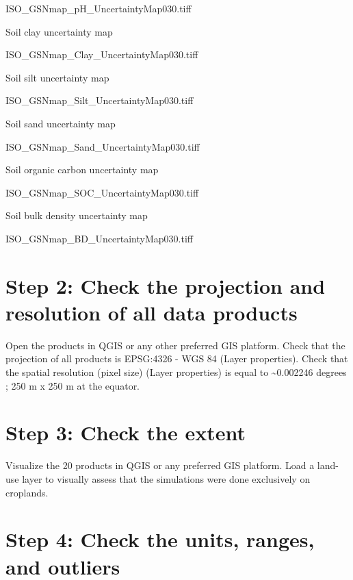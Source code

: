 \documentclass[
  10pt,
  b5paper,
  oneside]{book}
\begin{document}
ISO\_GSNmap\_pH\_UncertaintyMap030.tiff

Soil clay uncertainty map

ISO\_GSNmap\_Clay\_UncertaintyMap030.tiff

Soil silt uncertainty map

ISO\_GSNmap\_Silt\_UncertaintyMap030.tiff

Soil sand uncertainty map

ISO\_GSNmap\_Sand\_UncertaintyMap030.tiff

Soil organic carbon uncertainty map

ISO\_GSNmap\_SOC\_UncertaintyMap030.tiff

Soil bulk density uncertainty map

ISO\_GSNmap\_BD\_UncertaintyMap030.tiff

\hypertarget{step-2-check-the-projection-and-resolution-of-all-data-products}{%
\section*{Step 2: Check the projection and resolution of all data products}\label{step-2-check-the-projection-and-resolution-of-all-data-products}}

Open the products in QGIS or any other preferred GIS platform. Check that the projection of all products is EPSG:4326 - WGS 84 (Layer properties). Check that the spatial resolution (pixel size) (Layer properties) is equal to \textasciitilde0.002246 degrees ; 250 m x 250 m at the equator.

\hypertarget{step-3-check-the-extent}{%
\section*{Step 3: Check the extent}\label{step-3-check-the-extent}}

Visualize the 20 products in QGIS or any preferred GIS platform. Load a land-use layer to visually assess that the simulations were done exclusively on croplands.

\hypertarget{step-4-check-the-units-ranges-and-outliers}{%
\section*{Step 4: Check the units, ranges, and outliers}\label{step-4-check-the-units-ranges-and-outliers}}
\end{document}
